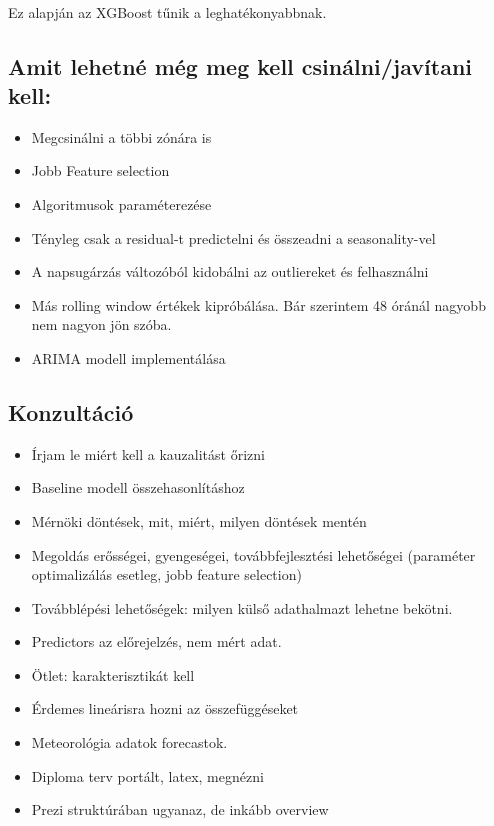 \documentclass[11pt]{article}
\providecommand{\tightlist}{%
      \setlength{\itemsep}{0pt}\setlength{\parskip}{0pt}}
\begin{document}
    \begin{center}
    \end{center}
    { \hspace*{\fill} \\}
    
    Ez alapján az XGBoost tűnik a leghatékonyabbnak.

    \subsection{Amit lehetné még meg kell csinálni/javítani
kell:}\label{amit-lehetnuxe9-muxe9g-meg-kell-csinuxe1lnijavuxedtani-kell}

\begin{itemize}
\tightlist
\item
  Megcsinálni a többi zónára is
\item
  Jobb Feature selection
\item
  Algoritmusok paraméterezése
\item
  Tényleg csak a residual-t predictelni és összeadni a seasonality-vel
\item
  A napsugárzás változóból kidobálni az outliereket és felhasználni
\item
  Más rolling window értékek kipróbálása. Bár szerintem 48 óránál
  nagyobb nem nagyon jön szóba.
\item
  ARIMA modell implementálása
\end{itemize}

    \subsection{Konzultáció}\label{konzultuxe1ciuxf3}

\begin{itemize}
\tightlist
\item
  Írjam le miért kell a kauzalitást őrizni
\item
  Baseline modell összehasonlításhoz
\item
  Mérnöki döntések, mit, miért, milyen döntések mentén
\item
  Megoldás erősségei, gyengeségei, továbbfejlesztési lehetőségei
  (paraméter optimalizálás esetleg, jobb feature selection)
\item
  Továbblépési lehetőségek: milyen külső adathalmazt lehetne bekötni.
\item
  Predictors az előrejelzés, nem mért adat.
\item
  Ötlet: karakterisztikát kell
\item
  Érdemes lineárisra hozni az összefüggéseket
\item
  Meteorológia adatok forecastok.
\item
  Diploma terv portált, latex, megnézni
\item
  Prezi struktúrában ugyanaz, de inkább overview
\end{itemize}


    
    
    
    
\end{document}
